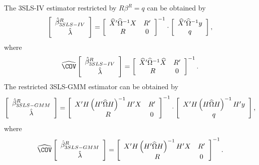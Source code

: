 The 3SLS-IV estimator restricted by $R \beta^R = q$ can be obtained by
\begin{equation}
   \left[ \begin{array}{c}
      \hat{\beta}^R_{3SLS-IV} \\[0.2em] \hat{\lambda}
   \end{array} \right]
   =
   \left[ \begin{array}{cc}
      \widehat{X}' \widehat{\Omega}^{-1} X & R' \\
      R & 0
   \end{array} \right]^{-1}
   \cdot
   \left[ \begin{array}{c}
      \widehat{X}' \widehat{\Omega}^{-1} y \\ q
   \end{array} \right] ,
   \label{eq:3slsIvR}
\end{equation}
where
\begin{equation}
   \COVHat
   \left[ \begin{array}{c}
      \bHat^R_{3SLS-IV} \\[0.2em] \lHat
   \end{array} \right] 
   = 
   \left[ \begin{array}{cc}
      \XHat' \OHat^{-1} \XHat & R' \\
      R & 0
   \end{array} \right]^{-1} .
\end{equation}
The restricted 3SLS-GMM estimator can be obtained by
\begin{equation}
   \left[ \begin{array}{c}
      \hat{\beta}^R_{3SLS-GMM} \\[0.2em] \hat{\lambda}
   \end{array} \right]
   =
   \left[ \begin{array}{cc}
      X' H \left( H' \widehat{\Omega} H \right)^{-1} H' X & R' \\
      R & 0
   \end{array} \right]^{-1}
   \cdot
   \left[ \begin{array}{c}
      X' H \left( H \widehat{\Omega} H \right)^{-1} H' y \\ q
   \end{array} \right] ,
   \label{eq:3slsGmmR}
\end{equation}
where
\begin{equation}
   \COVHat
   \left[ \begin{array}{c}
      \bHat^R_{3SLS-GMM} \\[0.2em] \lHat
   \end{array} \right] 
   = 
   \left[ \begin{array}{cc}
      X' H \left( H' \OHat H \right)^{-1} H' X & R' \\
      R & 0
   \end{array} \right]^{-1} .
\end{equation}
